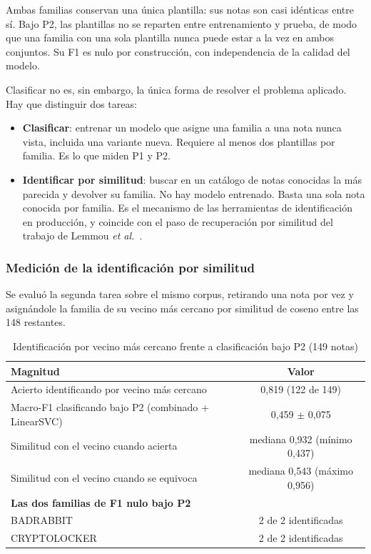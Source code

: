 Ambas familias conservan una única plantilla: sus notas son casi idénticas entre sí. Bajo P2, las plantillas no se reparten entre entrenamiento y prueba, de modo que una familia con una sola plantilla nunca puede estar a la vez en ambos conjuntos. Su F1 es nulo por construcción, con independencia de la calidad del modelo.

Clasificar no es, sin embargo, la única forma de resolver el problema aplicado. Hay que distinguir dos tareas:

\begin{itemize}
  \item \textbf{Clasificar}: entrenar un modelo que asigne una familia a una nota nunca vista, incluida una variante nueva. Requiere al menos dos plantillas por familia. Es lo que miden P1 y P2.
  \item \textbf{Identificar por similitud}: buscar en un catálogo de notas conocidas la más parecida y devolver su familia. No hay modelo entrenado. Basta una sola nota conocida por familia. Es el mecanismo de las herramientas de identificación en producción, y coincide con el paso de recuperación por similitud del trabajo de Lemmou \textit{et al.}~\cite{paper_5_note_files}.
\end{itemize}

\subsubsection*{Medición de la identificación por similitud}

Se evaluó la segunda tarea sobre el mismo corpus, retirando una nota por vez y asignándole la familia de su vecino más cercano por similitud de coseno entre las 148 restantes.

\begin{table}[ht]
\centering
\caption{Identificación por vecino más cercano frente a clasificación bajo P2 (149 notas)}
\label{tab:identificar}
\begin{tabular}{|l|c|}
\hline
\textbf{Magnitud} & \textbf{Valor} \\
\hline
Acierto identificando por vecino más cercano & 0,819 (122 de 149) \\
Macro-F1 clasificando bajo P2 (combinado + LinearSVC) & 0,459 $\pm$ 0,075 \\
Similitud con el vecino cuando acierta & mediana 0,932 (mínimo 0,437) \\
Similitud con el vecino cuando se equivoca & mediana 0,543 (máximo 0,956) \\
\hline
\multicolumn{2}{|l|}{\textbf{Las dos familias de F1 nulo bajo P2}} \\
\hline
BADRABBIT & 2 de 2 identificadas \\
CRYPTOLOCKER & 2 de 2 identificadas \\
\hline
\end{tabular}
\end{table}

